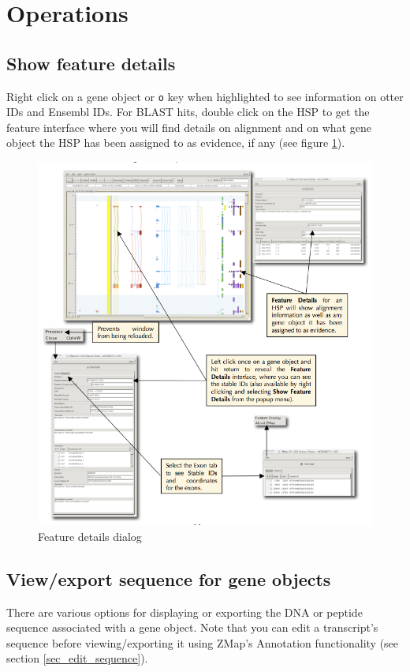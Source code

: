 \documentclass[letterpaper]{article}
\begin{document}
\clearpage
\section{Operations}

\subsection{Show feature details}
Right click on a gene object or \lstinline{o} key when highlighted to see information on otter IDs and Ensembl IDs. For BLAST hits, double click on the HSP to get the feature interface where you will find details on alignment and on what gene object the HSP has been assigned to as evidence, if any (see figure \ref{img_feature_details_dialog}).

\begin{figure}
\centering
\color[rgb]{0.30980393,0.5058824,0.7411765}
\includegraphics[width=15.231cm]{images/feature_details_dialog.png}
\caption{Feature details dialog}
\label{img_feature_details_dialog}
\end{figure}


\subsection{View/export sequence for gene objects} \label{sec_view_export_sequence}
There are various options for displaying or exporting the DNA or peptide sequence associated with a gene object. Note that you can edit a transcript's sequence before viewing/exporting it using ZMap's Annotation functionality (see section \ref{sec_edit_sequence}).
\end{document}
